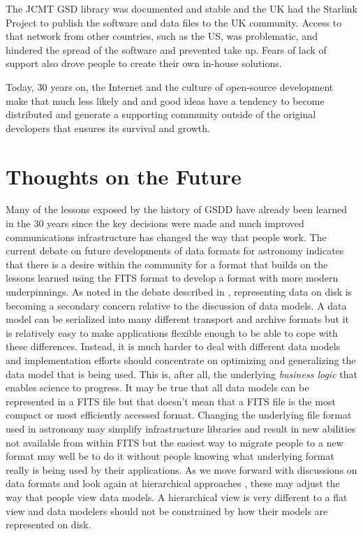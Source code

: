 \documentclass[final,authoryear,5p,times,twocolumn]{elsarticle}
\begin{document}
The JCMT GSD library was documented and stable and the UK had the
Starlink Project \citep{1982QJRAS..23..485D} to publish the software
and data files to the UK community. Access to that network from other
countries, such as the US, was problematic, and hindered the spread of
the software and prevented take up. Fears of lack of support also
drove people to create their own in-house solutions.

Today, 30 years on, the Internet and the culture of open-source
development make that much less likely and
and good ideas have a tendency to become distributed and generate a
supporting community outside of the original developers that ensures
its survival and growth.

\section{Thoughts on the Future}

Many of the lessons exposed by the history of GSDD have already been
learned in the 30 years since the key decisions were made and much
improved communications infrastructure has changed the way that people
work.  The current debate on future developments of data formats for
astronomy \citep[see e.g.][]{2015Thomas,2015Mink,2015MinkADASS}
indicates that there is a desire within the community for a format
that builds on the lessons learned using the FITS format to develop a
format with more modern underpinnings.  As noted in the debate
described in \citet{2015MinkADASS}, representing data on disk is
becoming a secondary concern relative to the discussion of data
models. A data model can be serialized into many different transport
and archive formats but
it is relatively easy to make applications flexible enough to be
able to cope with these differences. Instead, it is much harder to
deal with different data models and implementation efforts should
concentrate on optimizing and generalizing the data model that is
being used. This is, after all,
the underlying \emph{business logic} that enables science to progress.
It may be true that all data models can be represented in a FITS file
but that doesn't mean that a FITS file is the most compact or most
efficiently accessed format. Changing the underlying file format used
in astronomy may simplify infrastructure libraries and result in new
abilities not available from within FITS but the easiest way to
migrate people to a new format may well be to do it without people
knowing what underlying format really is being used by their
applications.  As we move forward with discussions on data formats and
look again at hierarchical approaches
\citep[e.g.][]{2015Price,2015HDS,2015ASDF}, these may adjust the way
that people view data models. A hierarchical view is very different to
a flat view and data modelers should not be constrained by how their
models are represented on disk.
\end{document}
